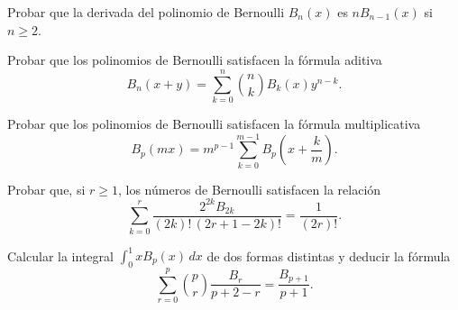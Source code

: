 \documentclass[12pt,a4paper]{book}
\begin{document}
    \begin{ejercicio}
        Probar que la derivada del polinomio de Bernoulli $B_{n}(x)$ es $nB_{n-1}(x)$ si
        $n\geq2$.
    \end{ejercicio}

    \begin{ejercicio}
        Probar que los polinomios de Bernoulli satisfacen la fórmula aditiva
        \begin{equation*}
            B_{n}(x+y)=\sum_{k=0}^{n}\binom{n}{k}B_{k}(x)y^{n-k}.
        \end{equation*}
    \end{ejercicio}

    \begin{ejercicio}
        Probar que los polinomios de Bernoulli satisfacen la fórmula multiplicativa
        \begin{equation*}
            B_{p}(mx)=m^{p-1}\sum_{k=0}^{m-1}B_{p}\left(x+\frac{k}{m}\right).
        \end{equation*}
    \end{ejercicio}

    \begin{ejercicio}
        Probar que, si $r\geq1$, los números de Bernoulli satisfacen la relación
        \begin{equation*}
            \sum_{k=0}^{r}\frac{2^{2k}B_{2k}}{(2k)!\,(2r+1-2k)!}=\frac{1}{(2r)!}.
        \end{equation*}
    \end{ejercicio}

    \begin{ejercicio}
        Calcular la integral $\int_{0}^{1}xB_{p}(x)\,dx$ de dos formas distintas y deducir la
        fórmula
        \begin{equation*}
            \sum_{r=0}^{p}\binom{p}{r}\frac{B_{r}}{p+2-r}=\frac{B_{p+1}}{p+1}.
        \end{equation*}
    \end{ejercicio}
\end{document}
